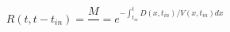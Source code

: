 \begin{equation}
R(t,t-t_{in}) = \frac{M}{} = e^{-\int_{t_{in}}^t D(x,t_{in})/V(x,t_{in}) dx}
\end{equation}